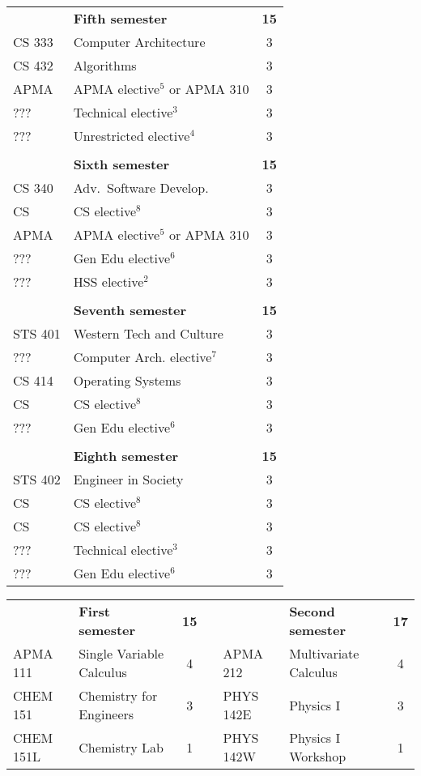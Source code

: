 \documentclass[12pt,twoside]{article}
\begin{document}
{\noindent\begin{tabular}{p{1.25in}p{4in}c}
& \bf Fifth semester				& \bf 15 \\
CS 333 & Computer Architecture 			& 3 \\
CS 432 & Algorithms 				& 3 \\
APMA & APMA elective$^5$ or APMA 310		& 3 \\
??? & Technical elective$^3$ 			& 3 \\
??? & Unrestricted elective$^4$ 		& 3 \\
\\
& \bf Sixth semester & \bf 15 \\
CS 340 & Adv.\ Software Develop. & 3 \\
CS & CS elective$^8$ & 3 \\
APMA & APMA elective$^5$ or APMA 310 & 3 \\
??? & Gen Edu elective$^6$ & 3 \\
??? & HSS elective$^2$ & 3 \\
\\
& \bf Seventh semester				& \bf 15 \\
STS 401 & Western Tech and Culture 		& 3 \\
??? & Computer Arch. elective$^7$ 		& 3 \\
CS 414 & Operating Systems 			& 3 \\
CS & CS elective$^8$ 				& 3 \\
??? & Gen Edu elective$^6$ 			& 3 \\
\\
& \bf Eighth semester & \bf 15 \\
STS 402 & Engineer in Society & 3 \\
CS & CS elective$^8$ & 3 \\
CS & CS elective$^8$ & 3 \\
??? & Technical elective$^3$ & 3 \\
??? & Gen Edu elective$^6$ & 3 \\
\end{tabular}
}{
\normalsize
\noindent \begin{tabular}{llccllc}
& \bf First semester				& \bf 15 & & & \bf Second semester & \bf 17 \\
APMA 111 & Single Variable Calculus 		& 4 & & APMA 212 & Multivariate Calculus & 4 \\
CHEM 151 & Chemistry for Engineers 		& 3 & & PHYS 142E & Physics I & 3 \\
CHEM 151L & Chemistry Lab 			& 1 & & PHYS 142W & Physics I Workshop & 1 \\

\end{tabular}}
\end{document}
